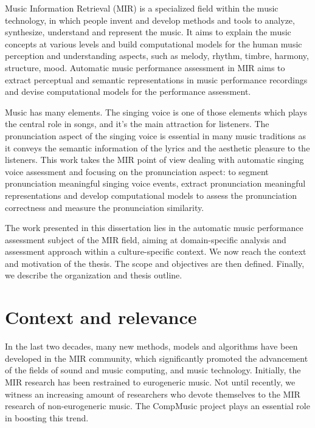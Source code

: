 Music Information Retrieval (MIR) is a specialized field within the music technology, in which people invent and develop methods and tools to analyze, synthesize, understand and represent the music. It aims to explain the music concepts at various levels and build computational models for the human music perception and understanding aspects, such as melody, rhythm, timbre, harmony, structure, mood. Automatic music performance assessment in MIR aims to extract perceptual and semantic representations in music performance recordings and devise computational models for the performance assessment.

Music has many elements. The singing voice is one of those elements which plays the central role in songs, and it's the main attraction for listeners. The pronunciation aspect of the singing voice is essential in many music traditions as it conveys the semantic information of the lyrics and the aesthetic pleasure to the listeners. This work takes the MIR point of view dealing with automatic singing voice assessment and focusing on the pronunciation aspect: to segment pronunciation meaningful singing voice events, extract pronunciation meaningful representations and develop computational models to assess the pronunciation correctness and measure the pronunciation similarity.

The work presented in this dissertation lies in the automatic music performance assessment subject of the MIR field, aiming at domain-specific analysis and assessment approach within a culture-specific context. We now reach the context and motivation of the thesis. The scope and objectives are then defined. Finally, we describe the organization and thesis outline. 

\section{Context and relevance}

In the last two decades, many new methods, models and algorithms have been developed in the MIR community, which significantly promoted the advancement of the fields of sound and music computing, and music technology. Initially, the MIR research has been restrained to eurogeneric music. Not until recently, we witness an increasing amount of researchers who devote themselves to the MIR research of non-eurogeneric music. The CompMusic project plays an essential role in boosting this trend.

